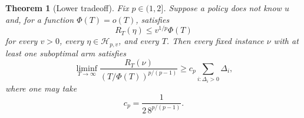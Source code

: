\documentclass[twoside]{article}
\newtheorem{theorem}{Theorem}
\newcommand{\cH}{\mathcal H}
\begin{document}
\begin{theorem}[Lower tradeoff]
\label{thm:lower-app}
Fix $p\in(1,2]$. Suppose a policy does not know $u$ and, for a function
$\Phi(T)=o(T)$, satisfies
\begin{equation}
 R_T(\eta)\leq v^{1/p}\Phi(T)
 \label{eq:moment-free-app}
\end{equation}
for every $v>0$, every $\eta\in\cH_{p,v}$, and every $T$. Then every fixed
instance $\nu$ with at least one suboptimal arm satisfies
\begin{equation}
 \liminf_{T\to\infty}
 \frac{R_T(\nu)}{(T/\Phi(T))^{p/(p-1)}}
 \geq c_p\sum_{i:\Delta_i>0}\Delta_i,
 \label{eq:lower-app}
\end{equation}
where one may take
\begin{equation}
 c_p=\frac{1}{2\,8^{p/(p-1)}}.
 \label{eq:cp}
\end{equation}
\end{theorem}
\end{document}
